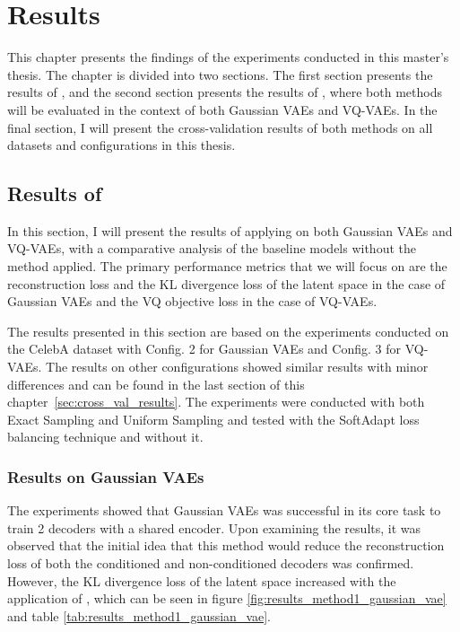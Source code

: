 \chapter{Results}

This chapter presents the findings of the experiments conducted in this master's thesis. The chapter is divided into two sections.
The first section presents the results of , and the second section presents the results of , where both methods will be evaluated in the context of both Gaussian VAEs and VQ-VAEs. In the final section, I will present the cross-validation results of both methods on all datasets and configurations in this thesis.

\section{Results of }

In this section, I will present the results of applying  on both Gaussian VAEs and VQ-VAEs, with a comparative analysis of the baseline models without the method applied. The primary performance metrics that we will focus on are the reconstruction loss and the KL divergence loss of the latent space in the case of Gaussian VAEs and the VQ objective loss in the case of VQ-VAEs. 

The results presented in this section are based on the experiments conducted on the CelebA dataset with Config. 2 for Gaussian VAEs and Config. 3 for VQ-VAEs. The results on other configurations showed similar results with minor differences and can be found in the last section of this chapter~\ref{sec:cross_val_results}. The experiments were conducted with both Exact Sampling and Uniform Sampling and tested with the SoftAdapt loss balancing technique and without it. 

\subsection{Results on Gaussian VAEs}

The experiments showed that Gaussian VAEs  was successful in its core task to train 2 decoders with a shared encoder. Upon examining the results, it was observed that the initial idea that this method would reduce the reconstruction loss of both the conditioned and non-conditioned decoders was confirmed. However, the KL divergence loss of the latent space increased with the application of , which can be seen in figure \ref{fig:results_method1_gaussian_vae} and table \ref{tab:results_method1_gaussian_vae}.


